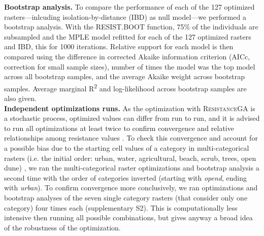 \documentclass[10pt, twoside]{book} %
\begin{document}
		\noindent \textbf{Bootstrap analysis.} To compare the performance of each of the 127 optimized rasters---inlcuding isolation-by-distance (IBD) as null model---we performed a bootstrap analysis. With the RESIST.BOOT function, 75$\%$ of the individuals are subsampled and the MPLE model refitted for each of the 127 optimized rasters and IBD, this for 1000 iterations. Relative support for each model is then compared using the difference in corrected Akaike information criterion (AICc, correction for small sample sizes), number of times the model was the top model across all bootstrap samples, and the average Akaike weight across bootstrap samples. Average marginal R\textsuperscript{2} and log-likelihood across bootstrap samples are also given.\\
		
		\noindent \textbf{Independent optimizations runs.} As the optimization with \textsc{ResistanceGA} is a stochastic process, optimized values can differ from run to run, and it is advised to run all optimizations at least twice to confirm convergence and relative relationships among resistance values \citep{peterman2018}. To check this convergence and account for a possible bias due to the starting cell values of a category in multi-categorical rasters (i.e. the initial order: urban, water, agricultural, beach, scrub, trees, open dune) \citep{peterman2018, kimmig2020}, we ran the multi-categorical raster optimizations and bootstrap analysis a second time with the order of categories inverted (starting with \textit{opend}, ending with \textit{urban}). To confirm convergence more conclusively, we ran optimizations and bootstrap analyses of the seven single category rasters (that consider only one category) four times each (supplementary S2). This is computationally less intensive then running all possible combinations, but gives anyway a broad idea of the robustness of the optimization.\\
		
\end{document}
